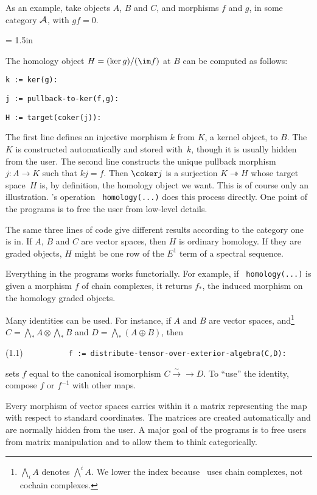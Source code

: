 As an example, take objects $A$, $B$ and $C$, and morphisms $f$ and
$g$, in some category $\cal A$, with $gf=0$.

\smallskip
\epsfxsize= 1.5in
\qquad\qquad\qquad\qquad\qquad\qquad\quad{}
\smallskip

\noindent The homology object $H = (\ker g)/(\im f)$ at $B$ can be
computed as follows:

{\tt k := ker(g):}

{\tt j := pullback-to-ker(f,g):}

{\tt H := target(coker(j)):}

\noindent The first line defines an injective morphism $k$ from $K$, a
kernel object, to $B$.  The $K$ is constructed automatically and
stored with~$k$, though it is usually hidden from the user.  The
second line constructs the unique pullback morphism $j : A \to K$ such
that $kj=f$.  Then $\coker j$ is a surjection $K \twoheadrightarrow H$
whose target space~$H$ is, by definition, the homology object we want.
This is of course only an illustration. \shh's operation {\tt
homology(...)} does this process directly.  One point of the programs
is to free the user from low-level details.

The same three lines of code give different results according to the
category one is in.  If $A$, $B$ and $C$ are vector spaces, then $H$
is ordinary homology.  If they are graded objects, $H$ might be one row of
the $E^1$ term of a spectral sequence.

Everything in the programs works functorially.  For example, if {\tt
homology(...)} is given a morphism $f$ of chain complexes, it returns
$f_*$, the induced morphism on the homology graded objects.

Many identities can be used.  For instance, if $A$ and $B$ are vector
spaces, and\footnote{$\bigwedge\nolimits_i A$ denotes $\bigwedge\nolimits^i A$.  We
lower the index because \shh\ uses chain complexes, not cochain
complexes.} $C = \bigwedge\nolimits_* A \otimes \bigwedge\nolimits_* B$ and $D =
\bigwedge\nolimits_*(A\oplus B)$, then

\smallskip\noindent
(1.1) {\tt
$\qquad\qquad$ f := distribute-tensor-over-exterior-algebra(C,D):}

\smallskip\noindent
sets $f$ equal to the canonical isomorphism $C \overset
\sim\to\longrightarrow D$.  To ``use'' the identity, compose $f$ or
$f^{-1}$ with other maps.

Every morphism of vector spaces carries within it a matrix
representing the map with respect to standard coordinates.  The
matrices are created automatically and are normally hidden from the
user.  A major goal of the programs is to free users from matrix
manipulation and to allow them to think categorically.


